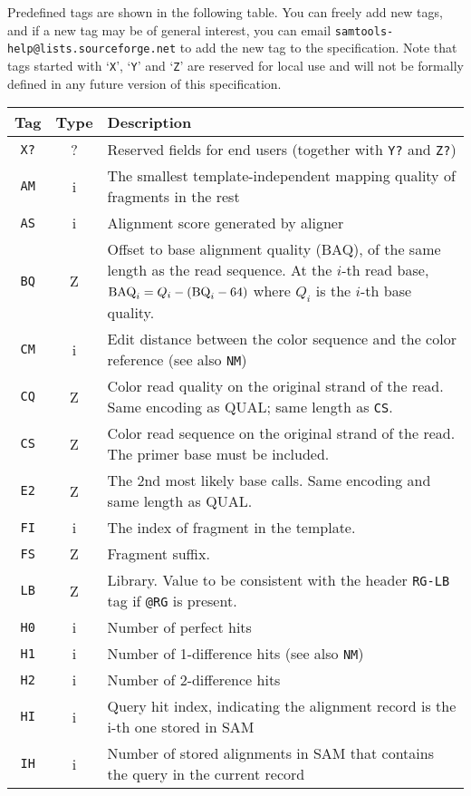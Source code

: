 \documentclass[10pt]{article}
\begin{document}
{\flushleft Predefined tags are shown in the following table. You can
  freely add new tags, and if a new tag may be of general interest, you
  can email {\tt samtools-help@lists.sourceforge.net} to add the new tag
  to the specification. Note that tags started with `{\tt X}', `{\tt Y}'
  and `{\tt Z}' are reserved for local use and will not be formally
  defined in any future version of this specification.}
\begin{center}\small
\begin{tabular}{ccp{12.5cm}}
  \hline
  {\bf Tag} & {\bf Type} & {\bf Description} \\
  \hline
  {\tt X?} & ? & Reserved fields for end users (together with {\tt Y?} and {\tt Z?}) \\
  {\tt AM} & i & The smallest template-independent mapping quality of fragments in the rest \\
  {\tt AS} & i & Alignment score generated by aligner \\
  {\tt BQ} & Z & Offset to base alignment quality (BAQ), of the same length as the read sequence.
  At the $i$-th read base, ${\rm BAQ}_i=Q_i-({\rm BQ}_i-64)$ where $Q_i$ is the $i$-th base quality. \\
  {\tt CM} & i & Edit distance between the color sequence and the color reference (see also {\tt NM})\\
  {\tt CQ} & Z & Color read quality on the original strand of the read. Same encoding as {\sf QUAL}; same length as {\tt CS}.\\
  {\tt CS} & Z & Color read sequence on the original strand of the read. The primer base must be included.\\
  {\tt E2} & Z & The 2nd most likely base calls. Same encoding and same length as {\sf QUAL}.\\
  {\tt FI} & i & The index of fragment in the template.\\
  {\tt FS} & Z & Fragment suffix.\\
  {\tt LB} & Z & Library. Value to be consistent with the header {\tt RG-LB} tag if {\tt @RG} is present.\\
  {\tt H0} & i & Number of perfect hits\\
  {\tt H1} & i & Number of 1-difference hits (see also {\tt NM})\\
  {\tt H2} & i & Number of 2-difference hits \\
  {\tt HI} & i & Query hit index, indicating the alignment record is the i-th one stored in SAM\\
  {\tt IH} & i & Number of stored alignments in SAM that contains the query in the current record\\

\end{tabular}
\end{center}
\end{document}
